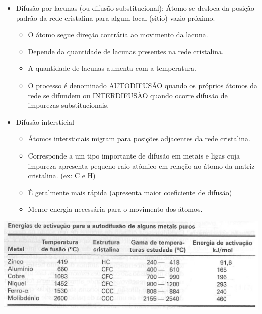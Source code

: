 \begin{itemize}
	\item Difusão por lacunas (ou difusão substitucional): Átomo se desloca da posição padrão da rede cristalina para algum local (sitio) vazio próximo.
	\begin{itemize}
		\item O átomo segue direção contrária ao movimento da lacuna.
		\item Depende da quantidade de lacunas presentes na rede cristalina.
		\item A quantidade de lacunas aumenta com a temperatura.
		\item O processo é denominado AUTODIFUSÃO quando os próprios átomos da rede se difundem ou INTERDIFUSÃO quando ocorre difusão de impurezas substitucionais.
	\end{itemize}
	\item Difusão intersticial
	\begin{itemize}
		\item Átomos intersticiais migram para posições adjacentes da rede cristalina.
		\item Corresponde a um tipo importante de difusão em metais e ligas cuja impureza apresenta pequeno raio atômico em relação ao átomo da matriz cristalina. (ex: C e H)
		\item É geralmente mais rápida (apresenta maior coeficiente de difusão)
		\item Menor energia necessária para o movimento dos átomos.
	\end{itemize}
\end{itemize}

\includegraphics[scale=0.2,trim={0 0 0 0}]{figures/Eativacao}

